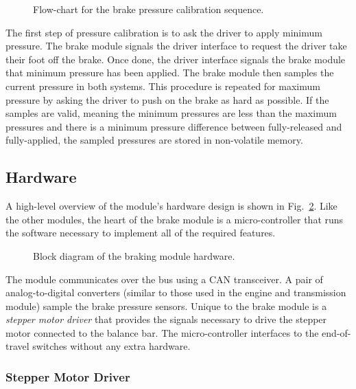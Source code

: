 \begin{figure}[H]
	\centering
	
	\caption{Flow-chart for the brake pressure calibration sequence.}
	\label{fig:brake_pressure_calibration_flow}
\end{figure}

The first step of pressure calibration is to ask the driver to apply minimum pressure. The brake module signals the driver interface to request the driver take their foot off the brake. Once done, the driver interface signals the brake module that minimum pressure has been applied. The brake module then samples the current pressure in both systems. This procedure is repeated for maximum pressure by asking the driver to push on the brake as hard as possible. If the samples are valid, meaning the minimum pressures are less than the maximum pressures and there is a minimum pressure difference between fully-released and fully-applied, the sampled pressures are stored in non-volatile memory.

\subsection{Hardware}

A high-level overview of the module's hardware design is shown in Fig.\ \ref{fig:brake_hardware_design_block}. Like the other modules, the heart of the brake module is a micro-controller that runs the software necessary to implement all of the required features. 

\begin{figure}[H]
\centering

\caption{Block diagram of the braking module hardware.}
\label{fig:brake_hardware_design_block}
\end{figure}

The module communicates over the bus using a CAN transceiver. A pair of analog-to-digital converters (similar to those used in the engine and transmission module) sample the brake pressure sensors. Unique to the brake module is a \emph{stepper motor driver} that provides the signals necessary to drive the stepper motor connected to the balance bar. The micro-controller interfaces to the end-of-travel switches without any extra hardware.

\subsubsection{Stepper Motor Driver}

